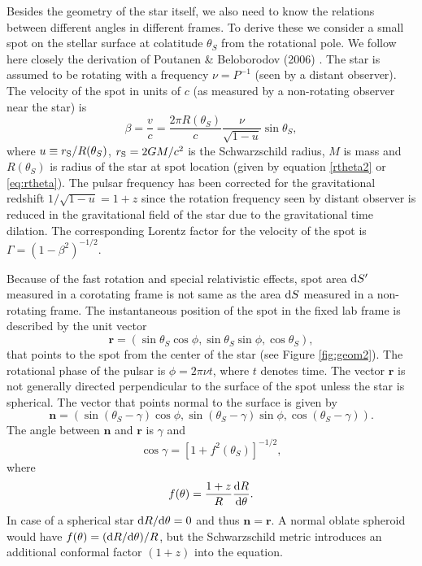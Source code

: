 \documentclass{wihuri}
\def\rg{r_{\rm S}} %
\def\be{\begin{equation}}
\def\ee{\end{equation}}
\def\d{{\rm d}}
\def\rg{r_{\rm S}} %
\def\thetas{\theta_{S}}
\newcommand{\bmath}[1]{\boldsymbol{#1}}
\begin{document}
Besides the geometry of the star itself, we also need to know the relations between different angles in different frames. To derive these we consider a small spot on the stellar surface at colatitude $\thetas$ from the rotational pole. We follow here closely the derivation of Poutanen \& Beloborodov (2006) \cite{poutabelo}. 
The star is assumed to be rotating  with a frequency $\nu=P^{-1}$ (seen by a distant observer).
The velocity of the spot in units of $c$ (as measured by a non-rotating observer near the star)  %
is 
\begin{equation}
\label{beta2}
\beta = \frac{v}{c}=\frac{2\pi R(\thetas)}{c} \frac{\nu}{\sqrt{1-u}} \sin\thetas, 
\end{equation}
where %
$u\equiv\rg/R(\thetas)$, 
$\rg=2GM/c^2$ is the Schwarzschild radius, $M$ is mass and $R(\thetas)$ is
radius of the star at spot location (given by equation \ref{rtheta2} or \ref{eq:rtheta}). The pulsar frequency has been corrected for the gravitational redshift $1/\sqrt{1-u}=1+z$ since the rotation frequency seen by distant observer is reduced in the gravitational field of the star due to the gravitational time dilation. The corresponding Lorentz factor for the velocity of the spot is $\Gamma=(1-\beta^2)^{-1/2}$.

Because of the fast rotation and special relativistic effects, spot area $\d S^\prime$ measured in a corotating frame is not same as the area $\d S$ measured in a non-rotating frame. The instantaneous position of the spot in the fixed lab frame is described by the unit vector 
\begin{equation}
\bmath{r}=(\sin\thetas\cos\phi, \sin\thetas\sin\phi, \cos\thetas),
\end{equation}
that points to the spot from the center of the star (see Figure \ref{fig:geom2}). The rotational phase of the pulsar is $\phi=2\pi\nu t$, where $t$ denotes time. The vector $\bmath{r}$ is not generally directed perpendicular to the surface of the spot unless the star is spherical. The vector that points normal to the surface is given by
\begin{equation}
\bmath{n}=(\sin(\thetas-\gamma)\cos\phi, \sin(\thetas-\gamma)\sin\phi, \cos(\thetas-\gamma)).
\end{equation}
The angle between $\bmath{n}$ and $\bmath{r}$ is $\gamma$ and 
\begin{equation}
\cos\gamma=[1+f^{2}(\thetas)]^{-1/2},
\end{equation}
where
\be \label{eq:ftheta}
f(\theta)=\frac{1+z}{R}\frac{\d R}{\d \theta}.
\ee
In case of a spherical star $\d R / \d \theta = 0$ and thus $\bmath{n} = \bmath{r}$. A normal oblate spheroid would have $f(\theta)=(\d R /\d \theta)/R$, but the Schwarzschild metric introduces an additional conformal factor $(1+z)$ into the equation. 
\end{document}
